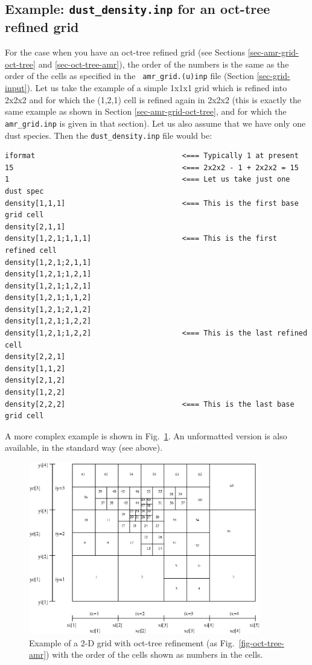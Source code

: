 \documentclass{report}
\newenvironment{asciibox}%
  {\begin{list}{}{%
    \setlength{\topsep}{0.5em}%
    \setlength{\parskip}{0em}%
    \setlength{\parsep}{0em}%
    \setlength{\itemsep}{0em}%
    \setlength{\rightmargin}{0em}%
    \setlength{\leftmargin}{3.0em}%
    \setlength{\labelsep}{1em}%
    \setlength{\labelwidth}{2em}%
  }\normalfont\footnotesize\item}
  {\end{list}}
\begin{document}
\subsection{Example: {\small\tt dust\_density.inp} for an oct-tree refined grid}
For the case when you have an oct-tree refined grid (see Sections
\ref{sec-amr-grid-oct-tree} and \ref{sec-oct-tree-amr}), the order of the
numbers is the same as the order of the cells as specified in the {\small\tt
  amr\_grid.(u)inp} file (Section \ref{sec-grid-input}).  Let us take the
example of a simple 1x1x1 grid which is refined into 2x2x2 and for which the
(1,2,1) cell is refined again in 2x2x2 (this is exactly the same example as
shown in Section \ref{sec-amr-grid-oct-tree}, and for which the {\small\tt
  amr\_grid.inp} is given in that section). Let us also assume that we have
only one dust species. Then the {\small\tt dust\_density.inp} file would be:
\begin{asciibox}\begin{verbatim}
iformat                                  <=== Typically 1 at present
15                                       <=== 2x2x2 - 1 + 2x2x2 = 15
1                                        <=== Let us take just one dust spec
density[1,1,1]                           <=== This is the first base grid cell
density[2,1,1]
density[1,2,1;1,1,1]                     <=== This is the first refined cell
density[1,2,1;2,1,1]
density[1,2,1;1,2,1]
density[1,2,1;1,2,1]
density[1,2,1;1,1,2]
density[1,2,1;2,1,2]
density[1,2,1;1,2,2]
density[1,2,1;1,2,2]                     <=== This is the last refined cell
density[2,2,1]
density[1,1,2]
density[2,1,2]
density[1,2,2]
density[2,2,2]                           <=== This is the last base grid cell
\end{verbatim}\end{asciibox}
A more complex example is shown in Fig.~\ref{fig-oct-tree-amr-numbered}.
An unformatted version is also available, in the standard way (see above).
%
\begin{figure}
\centerline{\includegraphics[width=0.9\textwidth]{oct_tree_amr.eps}}
\caption{\label{fig-oct-tree-amr-numbered}
Example of a 2-D grid with oct-tree refinement (as Fig.~\ref{fig-oct-tree-amr})
with the order of the cells shown as numbers in the cells.
}
\end{figure}
\end{document}
